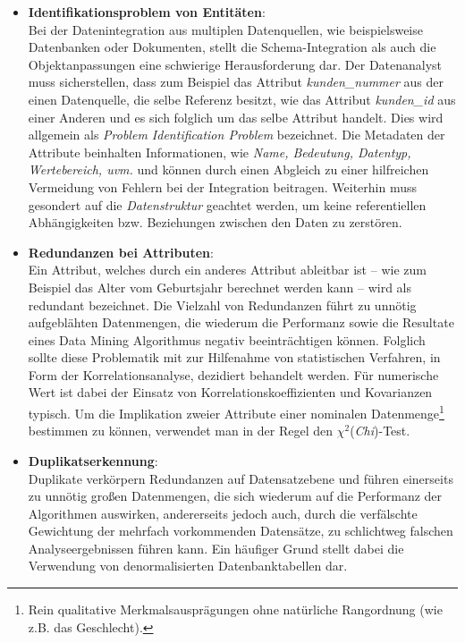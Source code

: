 \begin{itemize}
\item \textbf{Identifikationsproblem von Entitäten}:
\\ Bei der Datenintegration aus multiplen Datenquellen, wie beispielsweise Datenbanken oder Dokumenten, stellt die Schema-Integration als auch die Objektanpassungen eine schwierige Herausforderung dar. Der Datenanalyst muss sicherstellen, dass zum Beispiel das Attribut \textit{kunden\_nummer} aus der einen Datenquelle, die selbe Referenz besitzt, wie das Attribut \textit{kunden\_id} aus einer Anderen und es sich folglich um das selbe Attribut handelt. Dies wird allgemein als \textit{Problem Identification Problem} bezeichnet.  Die Metadaten der Attribute beinhalten Informationen, wie \textit{Name, Bedeutung, Datentyp, Wertebereich, uvm.} und können durch einen Abgleich zu einer hilfreichen Vermeidung von Fehlern bei der Integration beitragen. Weiterhin muss gesondert auf die \textit{Datenstruktur} geachtet werden, um keine referentiellen Abhängigkeiten bzw. Beziehungen zwischen den Daten zu zerstören. 

\item \textbf{Redundanzen bei Attributen}:
\\ Ein Attribut, welches durch ein anderes Attribut ableitbar ist -- wie zum Beispiel das Alter vom Geburtsjahr berechnet werden kann -- wird als redundant bezeichnet. Die Vielzahl von Redundanzen führt zu unnötig aufgeblähten Datenmengen, die wiederum die Performanz sowie die Resultate eines Data Mining Algorithmus negativ beeinträchtigen können. Folglich sollte diese Problematik mit zur Hilfenahme von statistischen Verfahren, in Form der Korrelationsanalyse, dezidiert behandelt werden. Für numerische Wert ist dabei der Einsatz von Korrelationskoeffizienten und Kovarianzen typisch. Um die Implikation zweier Attribute einer nominalen Datenmenge\footnote{Rein qualitative Merkmalsausprägungen ohne natürliche Rangordnung (wie z.B. das Geschlecht).} bestimmen zu können, verwendet man in der Regel den $\chi^2$(\textit{Chi})-Test. 

\item \textbf{Duplikatserkennung}:
\\ Duplikate verkörpern Redundanzen auf Datensatzebene und führen einerseits zu unnötig großen Datenmengen, die sich wiederum auf die Performanz der Algorithmen auswirken, andererseits jedoch auch, durch die verfälschte Gewichtung der mehrfach vorkommenden Datensätze, zu schlichtweg falschen Analyseergebnissen führen kann. Ein häufiger Grund stellt dabei die Verwendung von denormalisierten Datenbanktabellen dar.


\end{itemize}
